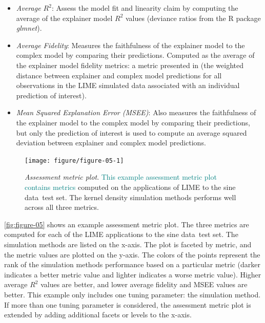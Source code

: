 \documentclass[AMS,STIX2COL]{WileyNJD-v2}\usepackage[]{graphicx}\usepackage[]{color}
\newenvironment{knitrout}{}{} %
\newcommand{\kge}[1]{\textcolor{teal}{#1}}
\newcommand{\data}{sine data}
\renewcommand{\sout}[1]{\unskip}
\begin{document}
\begin{itemize}
\item \emph{Average $R^2$}: Assess the model fit and linearity claim by computing the average of the explainer model $R^2$ values (deviance ratios from the R package \emph{glmnet}).

\item \emph{Average Fidelity}: Measures the faithfulness of the explainer model to the complex model by comparing their predictions. Computed as the average of the explainer model fidelity metrics: a metric presented in \citet{ribeiro:2016} (the weighted distance between explainer and complex model predictions for all observations in the LIME simulated data associated with an individual prediction of interest). 

\item \emph{Mean Squared Explanation Error (MSEE)}: Also measures the faithfulness of the explainer model to the complex model by comparing their predictions, but only the prediction of interest is used to compute an average squared deviation between explainer and complex model predictions.
\end{itemize}

\begin{figure}[!tp]
\begin{knitrout}
\color{fgcolor}

{\centering \texttt{[image: figure/figure-05-1]} 

}



\end{knitrout}
\caption{\emph{Assessment metric plot}. \kge{This example assessment metric plot contains metrics} \sout{The assessment metrics} computed on the applications of LIME to the \data \ test set\sout{are included in this example assessment metric plot}. \sout{Each horizontal facet corresponds to one of three metrics: average $R^2$, average fidelity, or MSEE. The LIME tuning parameter values (simulation methods in this example) are plotted on the x-axis, and the metric values are shown on the y-axis. The points are colored by rank (within a metric) indicating best to worst (dark to light).} The kernel density simulation methods performs well across all three metrics.}
\label{fig:figure-05}
\end{figure}

\autoref{fig:figure-05} shows an example assessment metric plot. The three metrics are computed for each of the LIME applications to the \data \ test set. The simulation methods are listed on the x-axis. The plot is faceted by metric, and the metric values are plotted on the y-axis. The colors of the points represent the rank of the simulation methods performance based on a particular metric (darker indicates a better metric value and lighter indicates a worse metric value). Higher average $R^2$ values are better, and lower average fidelity and MSEE values are better. This example only includes one tuning parameter: the simulation method. If more than one tuning parameter is considered, the assessment metric plot is extended by adding additional facets or levels to the x-axis.
\end{document}

